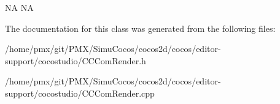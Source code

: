 NA  NA 

The documentation for this class was generated from the following files\+:\begin{DoxyCompactItemize}
\item 
/home/pmx/git/\+P\+M\+X/\+Simu\+Cocos/cocos2d/cocos/editor-\/support/cocostudio/C\+C\+Com\+Render.\+h\item 
/home/pmx/git/\+P\+M\+X/\+Simu\+Cocos/cocos2d/cocos/editor-\/support/cocostudio/C\+C\+Com\+Render.\+cpp\end{DoxyCompactItemize}
